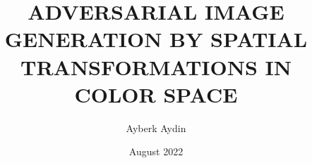 \documentclass[chaparabic,mas,ms,12pt,oneandhalf,threejury]{metu}
\author{Ayberk Aydin} %
\title{ADVERSARIAL IMAGE GENERATION BY SPATIAL TRANSFORMATIONS IN COLOR SPACE} %
\date{August 2022} %
\begin{document}
\begin{preliminaries}

  
\end{preliminaries}
%   
% 
%

\setlength{\parindent}{0em}
\setlength{\parskip}{10pt}











%
%

%

% 

\appendix



%
\end{document}
